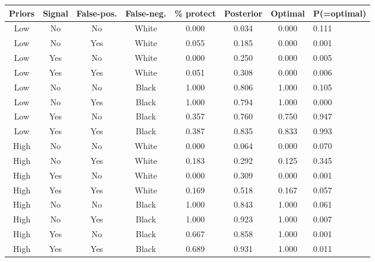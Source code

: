 \begin{table}[H]\centering \scriptsize \begin{tabular}{ccccccc} \hline \hline
\textbf{Priors}&\textbf{Signal}&\textbf{False-pos.}&\textbf{False-neg.}&\textbf{\% protect}& \textbf{Posterior} & \textbf{Optimal} & \textbf{P(=optimal)} \\ \hline
Low&No&No&White&0.000&0.034&0.000&0.111\\
Low&No&Yes&White&0.055&0.185&0.000&0.001\\
Low&Yes&No&White&0.000&0.250&0.000&0.005\\
Low&Yes&Yes&White&0.051&0.308&0.000&0.006\\
Low&No&No&Black&1.000&0.806&1.000&0.105\\
Low&No&Yes&Black&1.000&0.794&1.000&0.000\\
Low&Yes&No&Black&0.357&0.760&0.750&0.947\\
Low&Yes&Yes&Black&0.387&0.835&0.833&0.993\\
High&No&No&White&0.000&0.064&0.000&0.070\\
High&No&Yes&White&0.183&0.292&0.125&0.345\\
High&Yes&No&White&0.000&0.309&0.000&0.001\\
High&Yes&Yes&White&0.169&0.518&0.167&0.057\\
High&No&No&Black&1.000&0.843&1.000&0.061\\
High&No&Yes&Black&1.000&0.923&1.000&0.007\\
High&Yes&No&Black&0.667&0.858&1.000&0.001\\
High&Yes&Yes&Black&0.689&0.931&1.000&0.011\\
\hline \end{tabular} \end{table}
